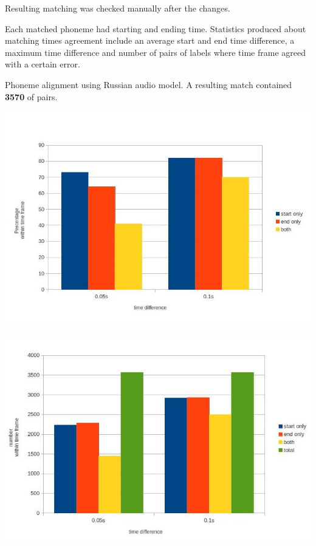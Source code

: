 \documentclass[12pt,a4paper,english]{article}
\begin{document}
Resulting matching was checked manually after the changes. \newline

Each matched phoneme had starting and ending time. Statistics produced about matching times agreement include an average start and end time difference, a maximum time difference and number of pairs of labels where time frame agreed with a certain error.

\newpage
Phoneme alignment using Russian audio model. \newline
A resulting match contained \textbf{3570} of pairs.
\begin{center}
    \includegraphics[scale=0.4]{corpora_phoneme_russian_results.jpg}
\end{center}
\begin{center}
    \includegraphics[scale=0.4]{corpora_phoneme_russian_counts.jpg}
\end{center}
\end{document}
